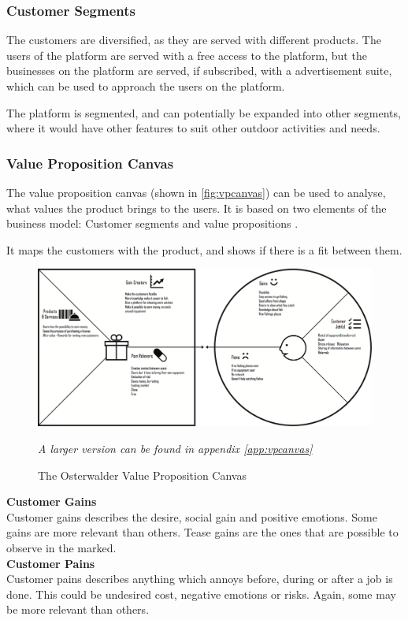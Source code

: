 \subsubsection{Customer Segments}
The customers are diversified, as they are served with different products. The users of the platform are served with a free access to the platform, but the businesses on the platform are served, if subscribed, with a advertisement suite, which can be used to approach the users on the platform.

The platform is segmented, and can potentially be expanded into other segments, where it would have other features to suit other outdoor activities and needs.

\subsubsection{Value Proposition Canvas}
The value proposition canvas (shown in \autoref{fig:vpcanvas}) can be used to analyse, what values the product brings to the users. It is based on two elements of the business model: Customer segments and value propositions \cite{vpcanvas}. 

It maps the customers with the product, and shows if there is a fit between them.
\begin{figure}[H]
  \centering
  \includegraphics[width=.45\textwidth]{images/value_proposition_canvas.png}
  \caption{The Osterwalder Value Proposition Canvas}
  \label{fig:vpcanvas}
  \footnotesize{\textit{A larger version can be found in appendix \ref{app:vpcanvas}}}
\end{figure}

{\noindent \textbf{Customer Gains\\}}
Customer gains describes the desire, social gain and positive emotions. Some gains are more relevant than others. Tease gains are the ones that are possible to observe in the marked.\\
  
{\noindent \textbf{Customer Pains\\}}
Customer pains describes anything which annoys before, during or after a job is done. This could be undesired cost, negative emotions or risks. Again, some may be more relevant than others. \\

